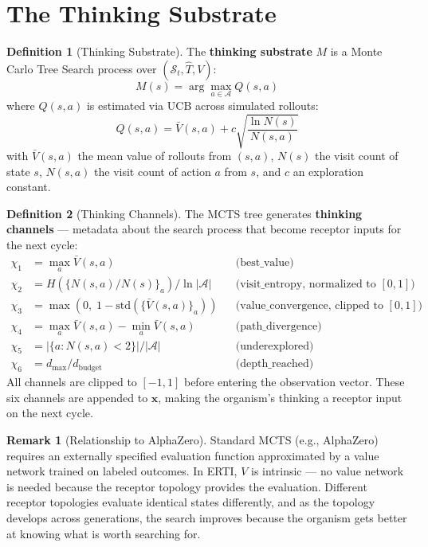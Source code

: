 \documentclass[12pt]{article}
\theoremstyle{definition}
\newtheorem{definition}{Definition}
\newtheorem{remark}{Remark}
\begin{document}
\section{The Thinking Substrate}

\begin{definition}[Thinking Substrate]
The \textbf{thinking substrate} $M$ is a Monte Carlo Tree Search process over $(\mathcal{S}_t, \hat{T}, V)$:
\[
M(s) = \arg\max_{a \in \mathcal{A}} Q(s, a)
\]
where $Q(s,a)$ is estimated via UCB across simulated rollouts:
\[
Q(s, a) = \bar{V}(s, a) + c \sqrt{\frac{\ln N(s)}{N(s,a)}}
\]
with $\bar{V}(s,a)$ the mean value of rollouts from $(s,a)$, $N(s)$ the visit count of
state $s$, $N(s,a)$ the visit count of action $a$ from $s$, and $c$ an exploration
constant.
\end{definition}

\begin{definition}[Thinking Channels]
The MCTS tree generates \textbf{thinking channels} --- metadata about the search process
that become receptor inputs for the next cycle:
\begin{align*}
\chi_1 &= \max_{a} \bar{V}(s,a) && \text{(best\_value)} \\
\chi_2 &= H(\{N(s,a)/N(s)\}_a) / \ln|\mathcal{A}| && \text{(visit\_entropy, normalized to $[0,1]$)} \\
\chi_3 &= \max\!\left(0,\; 1 - \text{std}(\{\bar{V}(s,a)\}_a)\right) && \text{(value\_convergence, clipped to $[0,1]$)} \\
\chi_4 &= \max_a \bar{V}(s,a) - \min_a \bar{V}(s,a) && \text{(path\_divergence)} \\
\chi_5 &= |\{a : N(s,a) < 2\}| / |\mathcal{A}| && \text{(underexplored)} \\
\chi_6 &= d_{\max} / d_{\text{budget}} && \text{(depth\_reached)}
\end{align*}
All channels are clipped to $[-1, 1]$ before entering the observation vector.
These six channels are appended to $\mathbf{x}$, making the organism's thinking
a receptor input on the next cycle.
\end{definition}

\begin{remark}[Relationship to AlphaZero]
Standard MCTS (e.g., AlphaZero) requires an externally specified evaluation function
approximated by a value network trained on labeled outcomes. In ERTI, $V$ is intrinsic ---
no value network is needed because the receptor topology provides the evaluation.
Different receptor topologies evaluate identical states differently, and as the topology
develops across generations, the search improves because the organism gets better at
knowing what is worth searching for.
\end{remark}
\end{document}
